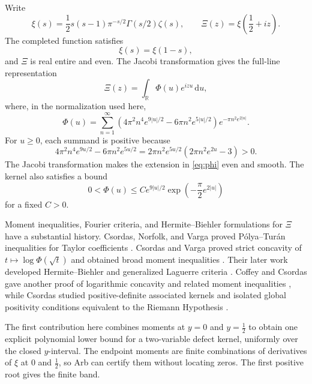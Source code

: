 \documentclass[11pt]{amsart}
\theoremstyle{remark}
\newcommand{\R}{\mathbb{R}}
\newcommand{\dd}{\,\mathrm{d}}
\begin{document}
Write
\begin{equation}\label{eq:xi-definition}
\xi(s)=\frac12s(s-1)\pi^{-s/2}\Gamma(s/2)\zeta(s),
\qquad
\Xi(z)=\xi\!\left(\frac12+iz\right).
\end{equation}
The completed function satisfies
\begin{equation}\label{eq:functional-equation}
\xi(s)=\xi(1-s),
\end{equation}
and $\Xi$ is real entire and even.  The Jacobi transformation gives the
full-line representation
\begin{equation}\label{eq:fourier}
\Xi(z)=\int_{\R}\Phi(u)e^{izu}\dd u,
\end{equation}
where, in the normalization used here,
\begin{equation}\label{eq:phi}
\Phi(u)=\sum_{n=1}^{\infty}
\left(4\pi^2n^4e^{9|u|/2}-6\pi n^2e^{5|u|/2}\right)
e^{-\pi n^2e^{2|u|}}.
\end{equation}
For $u\geq0$, each summand is positive because
\[
4\pi^2n^4e^{9u/2}-6\pi n^2e^{5u/2}
=2\pi n^2e^{5u/2}\left(2\pi n^2e^{2u}-3\right)>0.
\]
The Jacobi transformation makes the extension in \eqref{eq:phi} even and
smooth.  The kernel also satisfies a bound
\begin{equation}\label{eq:decay}
0<\Phi(u)\leq C e^{9|u|/2}
\exp\!\left(-\frac{\pi}{2}e^{2|u|}\right)
\end{equation}
for a fixed $C>0$.

Moment inequalities, Fourier criteria, and Hermite--Biehler formulations for
$\Xi$ have a substantial history.  Csordas, Norfolk, and Varga proved
P\'olya--Tur\'an inequalities for Taylor coefficients \cite{CNV1986}.
Csordas and Varga proved strict concavity of
$t\mapsto\log\Phi(\sqrt t)$ and obtained broad moment inequalities
\cite{CV1988}.  Their later work developed Hermite--Biehler and generalized
Laguerre criteria \cite{CV1989,CV1990}.  Coffey and Csordas gave another proof
of logarithmic concavity and related moment inequalities \cite{CC2013}, while
Csordas studied positive-definite associated kernels and isolated global
positivity conditions equivalent to the Riemann Hypothesis \cite{C2015}.

The first contribution here combines moments at $y=0$ and $y=\frac12$ to
obtain one explicit polynomial lower bound for a two-variable defect kernel,
uniformly over the closed $y$-interval.  The endpoint moments are finite
combinations of derivatives of $\xi$ at $0$ and $\frac12$, so Arb can certify
them without locating zeros.  The first positive root gives the finite band.
\end{document}

